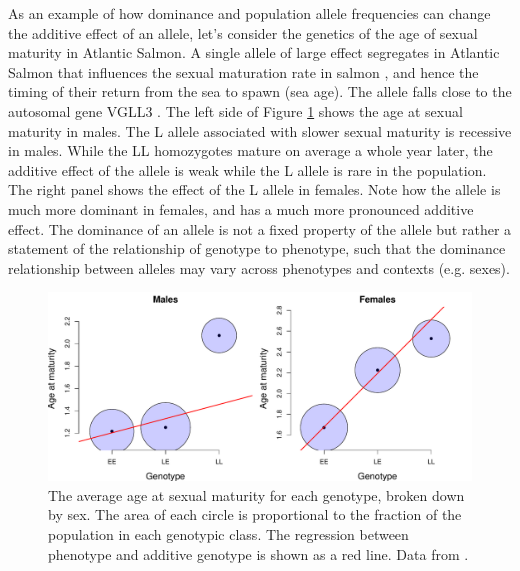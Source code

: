 As an example of how dominance and population allele frequencies
can change the additive effect of an allele, let's consider the
genetics of the age of sexual maturity in Atlantic Salmon. A single
allele of large effect segregates in Atlantic Salmon that influences
the sexual maturation rate in salmon
\citep{ayllon2015vgll3,barson2015sex}, and hence the timing of their
return from the sea to spawn (sea age). The allele falls close to the
autosomal gene VGLL3 \citep[variation at this gene in humans also
influences the timing of puberty]{cousminer2013genome}. The left side
of Figure \ref{fig:salmon_add_dom} shows the age at  sexual maturity
in males. The L allele associated with slower sexual maturity is recessive in males. While the LL homozygotes mature on average a whole year later, the additive effect of the allele is weak while the L allele is rare in the population. The right panel shows the effect of the L allele in females. Note how the allele is much more dominant in females, and has a much more pronounced additive effect. The dominance of an allele is not a fixed property of the allele but rather a statement of the relationship of genotype to phenotype, such that the dominance relationship between alleles may vary across phenotypes and contexts (e.g. sexes). %



\begin{figure}
\begin{center}
\includegraphics[width=\textwidth]{Journal_figs/Quant_gen/salmon_age/Salmon_age_dom.pdf}
\end{center}
\caption{The average age at sexual maturity for each genotype, broken
  down by sex. 
The area of each circle is proportional to the fraction of
the population in each genotypic class. The regression between phenotype and additive genotype is
  shown as a red line. Data from \citet{barson2015sex}. } \label{fig:salmon_add_dom} %
\end{figure}

